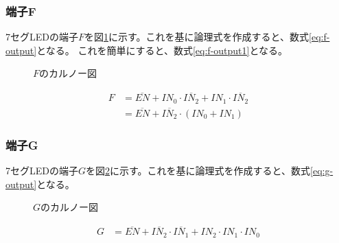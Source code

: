\documentclass[a4paper,11pt,dvipdfmx]{jsarticle}
\begin{document}
\subsubsection{端子F}
7セグLEDの端子$F$を図\ref{fig:karnoF}に示す。これを基に論理式を作成すると、数式\eqref{eq:f-output}となる。
これを簡単にすると、数式\eqref{eq:f-output1}となる。\\
\begin{figure}[H]
  \centering
    \centering
    \caption{\(F\)のカルノー図}
    \label{fig:karnoF}
\end{figure}

\begin{align}
  F &= \overline{EN} + IN_0 \cdot \overline{IN_2} + IN_1 \cdot \overline{IN_2}\label{eq:f-output}\\
  &= \overline{EN} + \overline{IN_2} \cdot (IN_0 + IN_1) \label{eq:f-output1}
\end{align}

\subsubsection{端子G}
\label{sec:g}
7セグLEDの端子$G$を図\ref{fig:karnoG}に示す。これを基に論理式を作成すると、数式\eqref{eq:g-output}となる。
\begin{figure}[H]
  \centering
  \caption{\(G\)のカルノー図}
  \label{fig:karnoG}
\end{figure}

\begin{align}
  G &= \overline{EN} + \overline{IN_2} \cdot \overline{IN_1}+ IN_2 \cdot IN_1 \cdot IN_0\label{eq:g-output}
\end{align}
\end{document}
